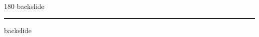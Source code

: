
\begin{frame}
\begin{center}
\begin{turn}{180}
{\fontsize{2.5cm}{1em}\selectfont backslide}
\end{turn}
\vspace{1em}\par  
\hrule
\vspace{1em}\par  
{\fontsize{2.5cm}{1em}\selectfont backslide}
\end{center}
\end{frame}
